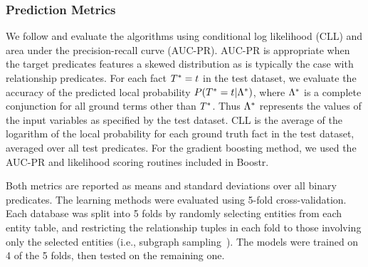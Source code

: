 \documentclass[runningheads,a4paper]{llncs}
\begin{document}


\subsubsection{Prediction Metrics}
We follow \cite{Khot2011} and evaluate the algorithms using conditional log likelihood (CLL) and area under the precision-recall curve (AUC-PR). AUC-PR is appropriate when the target predicates features a skewed distribution as is typically the case with relationship predicates. %
For each fact $T^{*}\hspace{0.0ex} = t$ in the test dataset, we evaluate the accuracy of the predicted local probability $P(T^{*}\hspace{0.0ex} = t | \Lambda^{*}\hspace{0.0ex})$, where $\Lambda^{*}\hspace{0.0ex}$ is a complete conjunction for all ground terms other than $T^{*}\hspace{0.0ex}$. Thus $\Lambda^{*}\hspace{0.0ex}$ represents the values of the input variables as specified by the test dataset.
CLL is the average of the logarithm of the local probability for each ground truth fact in the test dataset, averaged over all test predicates. For the gradient boosting method, we used the AUC-PR and likelihood scoring routines included in Boostr.


Both metrics are reported as means and standard deviations over all binary predicates. The learning methods were evaluated using 5-fold cross-validation. Each database was split into 5 folds by randomly selecting entities from each entity table, and restricting the relationship tuples in each fold to those involving only the selected entities  (i.e., subgraph sampling~\cite{Schulte2012}). The models were trained on 4 of the 5 folds, then tested on the remaining one. 
\end{document}
